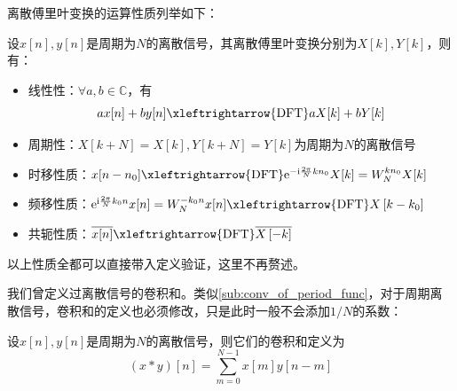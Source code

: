 离散傅里叶变换的运算性质列举如下：
\begin{proposition}[离散傅里叶变换的运算性质]
    设$x[n],y[n]$是周期为$N$的离散信号，其离散傅里叶变换分别为$X[k],Y[k]$，则有：\begin{itemize}
        \item 线性性：$\forall a,b\in\mathbb{C}$，有
    \[a x[n]+b y[n]\xleftrightarrow{\mathrm{DFT}} a X[k]+b Y[k]\]
        \item 周期性：$X[k+N]=X[k],Y[k+N]=Y[k]$为周期为$N$的离散信号
        \item 时移性质：$x[n-n_0]\xleftrightarrow{\mathrm{DFT}}\mathrm{e}^{-\mathrm{i}\frac{2\pi}{N}kn_0}X[k]=W_N^{kn_0}X[k]$
        \item 频移性质：$\mathrm{e}^{\mathrm{i}\frac{2\pi}{N}k_0 n}x[n]=W_N^{-k_0 n}x[n]\xleftrightarrow{\mathrm{DFT}}X\left[k-k_0\right]$
        \item 共轭性质：$\overline{x[n]}\xleftrightarrow{\mathrm{DFT}}\overline{X\left[-k\right]}$
    \end{itemize}
\end{proposition}

以上性质全都可以直接带入定义验证，这里不再赘述。

我们曾定义过离散信号的卷积和。类似\ref{sub:conv_of_period_func}，对于周期离散信号，卷积和的定义也必须修改，只是此时一般不会添加$1/N$的系数：
\begin{definition}[周期离散信号的卷积和]
    设$x[n],y[n]$是周期为$N$的离散信号，则它们的卷积和定义为
    \[(x*y)[n]=\sum_{m=0}^{N-1}x[m]y[n-m]\]
\end{definition}

